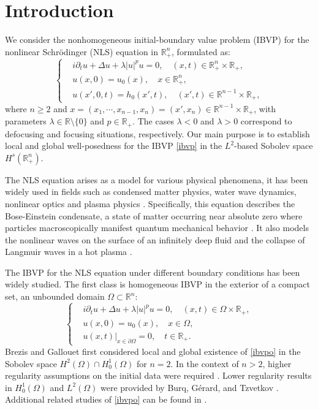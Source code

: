 \documentclass[preprint,compress,12pt]{elsarticle}
\numberwithin{equation}{section}
\begin{document}
	\section{Introduction}
	We consider the nonhomogeneous initial-boundary value problem (IBVP) for the nonlinear Schr\"{o}dinger (NLS) equation in $\mathbb{R}^{n}_{+}$, formulated as:
	\begin{equation}\label{ibvp}
		\left\{\begin{aligned}
			&	i\partial_{t}u+\Delta u+\lambda |u|^pu=0, \quad (x, t) \in \mathbb{R}_{+}^{n} \times \mathbb{R}_{+}, \\
			&u(x,0)=u_0(x), \quad x\in\mathbb{R}^{n}_{+},\\& u(x',0,t)=h_{0}(x',t), \quad  (x',t)\in \mathbb{R}^{n-1}\times \mathbb{R}_{+},
		\end{aligned}
		\right.		
	\end{equation}
	where $n\geq 2$ and $x=(x_{1},\cdots,x_{n-1},x_{n})=(x',x_{n})\in \mathbb{R}^{n-1}\times\mathbb{R}_{+}$, with parameters  $\lambda\in\mathbb{R}\setminus\{0\}$ and $p\in\mathbb{R}_{+}$. The cases $\lambda<0$ and $\lambda>0$
	correspond to defocusing and focusing situations, respectively.
	 Our main purpose is to establish local and global well-posedness for the IBVP \eqref{ibvp} in the $L^{2}$-based Sobolev space $H^{s}(\mathbb{R}^{n}_{+})$.
	
	The NLS equation arises as a model for various physical phenomena, it has been widely used in fields such as condensed matter physics, water wave dynamics, nonlinear optics and plasma physics  \cite{Gross, Pitaevskii, wuli, optic, Zakharov, Zakharov2}. Specifically, this equation describes the Bose-Einstein condensate, a state of matter occurring near absolute zero where particles macroscopically manifest quantum mechanical behavior \cite{Gross, Pitaevskii}. It also models the nonlinear waves on the surface of an infinitely deep fluid \cite{Zakharov} and the collapse of Langmuir waves in a hot plasma \cite{Zakharov2}.
	
	
	The IBVP for the NLS equation under different boundary conditions has been widely studied. The first class is homogeneous IBVP in the exterior of a compact set, an unbounded domain $\Omega\subset\mathbb{R}^{n}$:
	\begin{equation}\label{ibvpo}
		\left\{\begin{aligned}
			&	i\partial_{t}u+\Delta u+\lambda |u|^pu=0, \quad (x, t) \in \Omega \times \mathbb{R}_{+}, \\
			&u(x,0)=u_0(x), \quad x\in\Omega, \\& u(x,t)|_{x\in\partial \Omega}=0, \quad t\in\mathbb{R}_{+}.
		\end{aligned}
		\right.		
	\end{equation}
	Brezis and Gallouet \cite{Brezis} first considered local and global existence of \eqref{ibvpo} in the Sobolev space $H^{2}(\Omega)\cap H_{0}^{1}(\Omega)$ for $n=2$. In the context of $n>2$, higher regularity assumptions on the initial data were required \cite{TM2,TY}. Lower regularity results in $H_{0}^{1}(\Omega)$ and $L^{2}(\Omega)$ were  provided by Burq, G\'{e}rard, and Tzvetkov \cite{Burq}. Additional related studies of \eqref{ibvpo} can be found in \cite{inveterate, novice, kil}.
	
\end{document}
